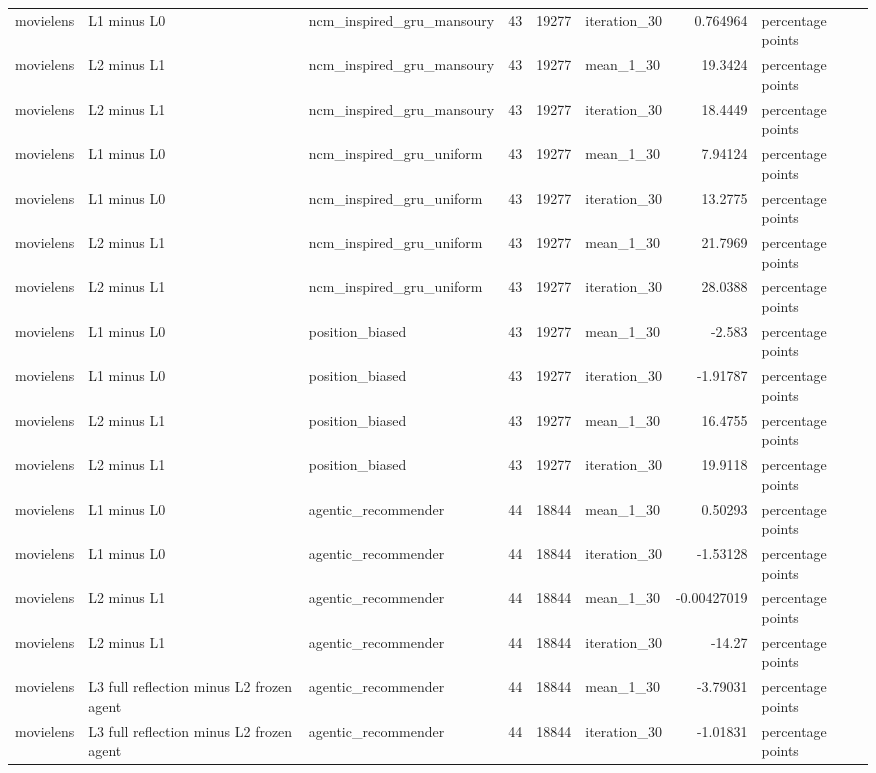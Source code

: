 \begin{table}[htbp!]
\begin{tabular}{lllrrlrl}
movielens & L1 minus L0 & ncm\_inspired\_gru\_mansoury & 43 & 19277 & iteration\_30 & 0.764964 & percentage points \\
movielens & L2 minus L1 & ncm\_inspired\_gru\_mansoury & 43 & 19277 & mean\_1\_30 & 19.3424 & percentage points \\
movielens & L2 minus L1 & ncm\_inspired\_gru\_mansoury & 43 & 19277 & iteration\_30 & 18.4449 & percentage points \\
movielens & L1 minus L0 & ncm\_inspired\_gru\_uniform & 43 & 19277 & mean\_1\_30 & 7.94124 & percentage points \\
movielens & L1 minus L0 & ncm\_inspired\_gru\_uniform & 43 & 19277 & iteration\_30 & 13.2775 & percentage points \\
movielens & L2 minus L1 & ncm\_inspired\_gru\_uniform & 43 & 19277 & mean\_1\_30 & 21.7969 & percentage points \\
movielens & L2 minus L1 & ncm\_inspired\_gru\_uniform & 43 & 19277 & iteration\_30 & 28.0388 & percentage points \\
movielens & L1 minus L0 & position\_biased & 43 & 19277 & mean\_1\_30 & -2.583 & percentage points \\
movielens & L1 minus L0 & position\_biased & 43 & 19277 & iteration\_30 & -1.91787 & percentage points \\
movielens & L2 minus L1 & position\_biased & 43 & 19277 & mean\_1\_30 & 16.4755 & percentage points \\
movielens & L2 minus L1 & position\_biased & 43 & 19277 & iteration\_30 & 19.9118 & percentage points \\
movielens & L1 minus L0 & agentic\_recommender & 44 & 18844 & mean\_1\_30 & 0.50293 & percentage points \\
movielens & L1 minus L0 & agentic\_recommender & 44 & 18844 & iteration\_30 & -1.53128 & percentage points \\
movielens & L2 minus L1 & agentic\_recommender & 44 & 18844 & mean\_1\_30 & -0.00427019 & percentage points \\
movielens & L2 minus L1 & agentic\_recommender & 44 & 18844 & iteration\_30 & -14.27 & percentage points \\
movielens & L3 full reflection minus L2 frozen agent & agentic\_recommender & 44 & 18844 & mean\_1\_30 & -3.79031 & percentage points \\
movielens & L3 full reflection minus L2 frozen agent & agentic\_recommender & 44 & 18844 & iteration\_30 & -1.01831 & percentage points \\

\end{tabular}
\end{table}
